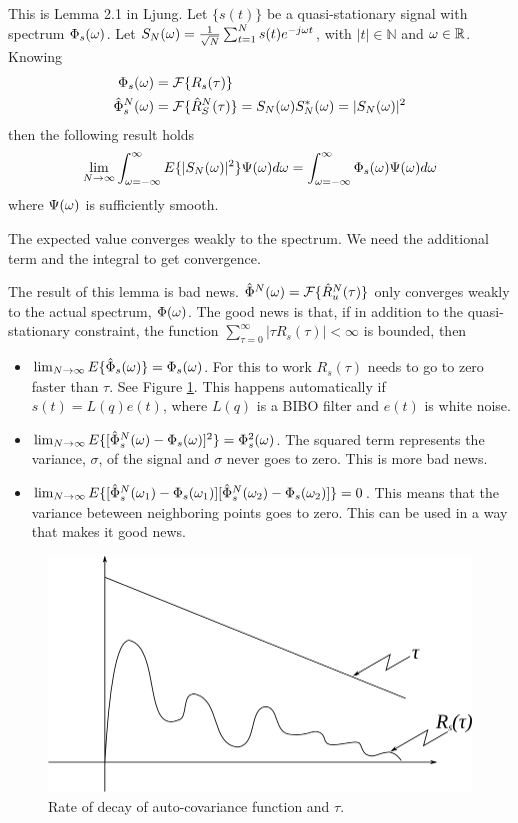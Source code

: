 \begin{lemma}
This is Lemma 2.1 in Ljung. Let $\{s(t)\}$ be a quasi-stationary signal with spectrum $\Phi_s(\omega)$. Let $S_N(\omega) = \frac{1}{\sqrt{N}} \sum_{t=1}^N s(t)e^{-j\omega t}$, with $|t|\in\mathbb{N}$ and $\omega\in\mathbb{R}$. Knowing
\begin{align*}
\Phi_s(\omega) &= \mathcal{F}\{R_s(\tau)\} \\
\hat{\Phi}_s^N(\omega) &= \mathcal{F}\{\hat{R}_S^N(\tau)\} = S_N(\omega)S_N^*(\omega) = |S_N(\omega)|^2
\end{align*}
then the following result holds
$$\lim_{N\to\infty} \int_{\omega=-\infty}^\infty E\{|S_N(\omega)|^2\}\Psi(\omega)d\omega = \int_{\omega=-\infty}^\infty \Phi_s(\omega)\Psi(\omega)d\omega$$
where $\Psi(\omega)$ is sufficiently smooth.
\end{lemma}
The expected value converges weakly to the spectrum. We need the additional term and the integral to get convergence.

The result of this lemma is bad news. $\hat{\Phi}^N(\omega) = \mathcal{F}\{\hat{R}_u^N(\tau)\}$ only converges weakly to the actual spectrum, $\Phi(\omega)$. The good news is that, if in addition to the quasi-stationary constraint, the function $\sum_{\tau=0}^\infty|\tau R_s(\tau)|<\infty$ is bounded, then
\begin{itemize}
\item $\lim_{N\to\infty}E\{\hat{\Phi}_s(\omega)\} = \Phi_s(\omega)$. For this to work $R_s(\tau)$ needs to go to zero faster than $\tau$. See Figure \ref{fig:06autoCovDecay}. This happens automatically if $s(t)=L(q)e(t)$, where $L(q)$ is a BIBO filter and $e(t)$ is white noise.
\item $\lim_{N\to\infty}E\{[\hat{\Phi}_s^N(\omega)-\Phi_s(\omega)]^2\} = \Phi_s^2(\omega)$. The squared term represents the variance, $\sigma$, of the signal and $\sigma$ never goes to zero. This is more bad news.
\item $\lim_{N\to\infty}E\{[\hat{\Phi}_s^N(\omega_1)-\Phi_s(\omega_1)][\hat{\Phi}_s^N(\omega_2)-\Phi_s(\omega_2)]\} = 0$. This means that the variance beteween neighboring points goes to zero. This can be used in a way that makes it good news.
\end{itemize}

\begin{figure}[ht!]
	\centering
	\includegraphics[width=.4\textwidth]{images/06autoCovDecay}
	\caption{Rate of decay of auto-covariance function and $\tau$.}
	\label{fig:06autoCovDecay}
\end{figure}

